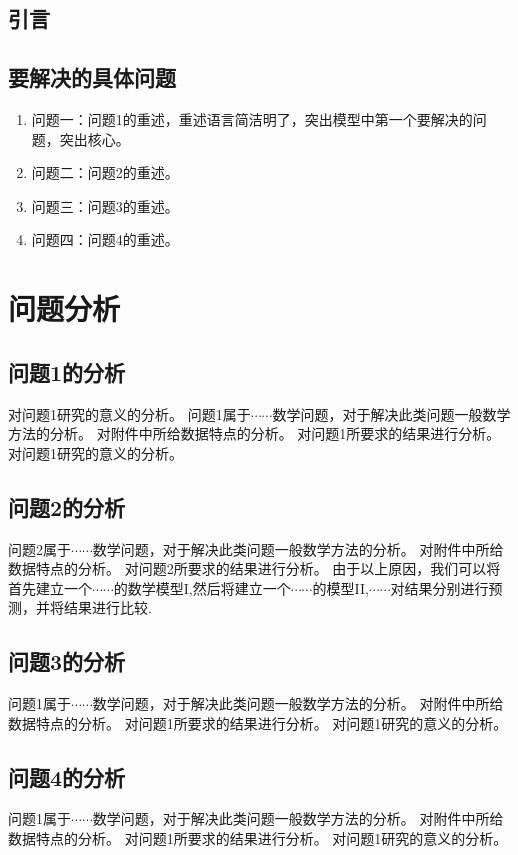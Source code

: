 \documentclass[12pt,a4paper]{nmmcm}
\begin{document}
\subsection{引言}


\subsection{要解决的具体问题}
\begin{enumerate}
  \item
        问题一：问题1的重述，重述语言简洁明了，突出模型中第一个要解决的问题，突出核心。
  \item
        问题二：问题2的重述。
  \item
        问题三：问题3的重述。
  \item
        问题四：问题4的重述。
\end{enumerate}


\section{问题分析}
\subsection{问题1的分析}

对问题1研究的意义的分析。
问题1属于$\cdots\cdots$数学问题，对于解决此类问题一般数学方法的分析。
对附件中所给数据特点的分析。
对问题1所要求的结果进行分析。
对问题1研究的意义的分析。


\subsection{问题2的分析}
问题2属于$\cdots\cdots$数学问题，对于解决此类问题一般数学方法的分析。
对附件中所给数据特点的分析。
对问题2所要求的结果进行分析。
由于以上原因，我们可以将首先建立一个$\cdots\cdots$的数学模型I,然后将建立一个$\cdots\cdots$的模型II,$\cdots\cdots$对结果分别进行预测，并将结果进行比较.


\subsection{问题3的分析}
问题1属于$\cdots\cdots$数学问题，对于解决此类问题一般数学方法的分析。
对附件中所给数据特点的分析。
对问题1所要求的结果进行分析。
对问题1研究的意义的分析。

\subsection{问题4的分析}
问题1属于$\cdots\cdots$数学问题，对于解决此类问题一般数学方法的分析。
对附件中所给数据特点的分析。
对问题1所要求的结果进行分析。
对问题1研究的意义的分析。
\end{document}
